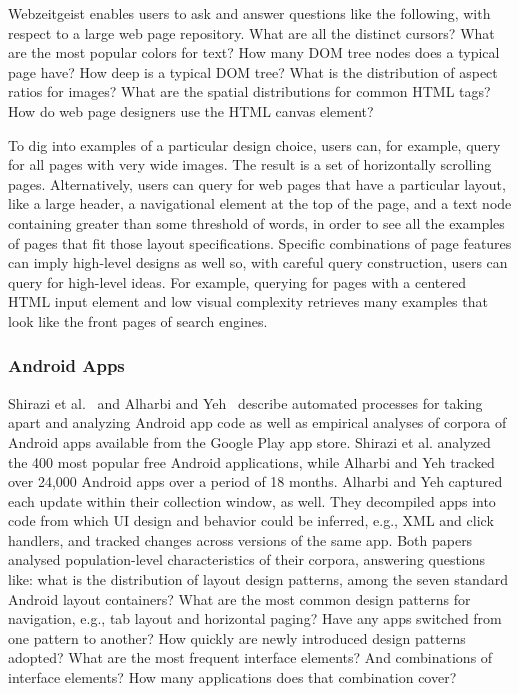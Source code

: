 Webzeitgeist enables users to ask and answer questions like the following, with respect to a large web page repository. What are all the distinct cursors? What are the most popular colors for text? How many DOM tree nodes does a typical page have? How deep is a typical DOM tree? What is the distribution of aspect ratios for images? What are the spatial distributions for common HTML tags? How do web page designers use the HTML canvas element?

To dig into examples of a particular design choice, users can, for example, query for all pages with very wide images. The result is a set of horizontally scrolling pages. Alternatively, users can query for web pages that have a particular layout, like a large header, a navigational element at the top of the page, and a text node containing greater than some threshold of words, in order to see all the examples of pages that fit those layout specifications. Specific combinations of page features can imply high-level designs as well so, with careful query construction, users can query for high-level ideas. For example, querying for pages with a centered HTML input element and low visual complexity retrieves many examples that look like the front pages of search engines.

\subsubsection{Android Apps}

Shirazi et al.~\cite{Shirazi} and Alharbi and Yeh~\cite{Alharbi} describe automated processes for taking apart and analyzing Android app code as well as empirical analyses of corpora of Android apps available from the Google Play app store. Shirazi et al. analyzed the 400 most popular free Android applications, while Alharbi and Yeh tracked over 24,000 Android apps over a period of 18 months. Alharbi and Yeh captured each update within their collection window, as well. They decompiled apps into code from which UI design and behavior could be inferred, e.g., XML and click handlers, and tracked changes across versions of the same app. Both papers analysed population-level characteristics of their corpora, answering questions like: what is the distribution of layout design patterns, among the seven standard Android layout containers? What are the most common design patterns for navigation, e.g., tab layout and horizontal paging? Have any apps switched from one pattern to another?  How quickly are newly introduced design patterns adopted? What are the most frequent interface elements? And combinations of interface elements? How many applications does that combination cover?

